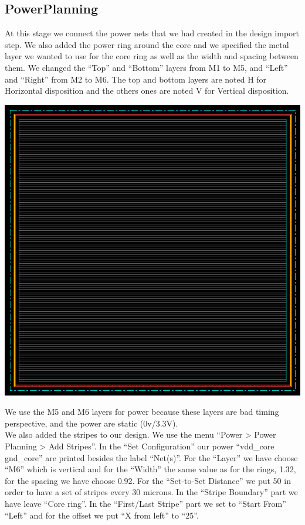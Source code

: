 \documentclass[12pt]{article}
\begin{document}
\subsection{PowerPlanning}
At this stage we connect the power nets that we had created in the design import step. We also added the power ring around the core and we specified the metal layer we wanted to use for the core ring as well as the width and spacing between them. We changed the “Top” and “Bottom” layers from M1 to M5, and “Left” and “Right” from M2 to M6. The top and bottom layers are noted H for Horizontal disposition and the others ones are noted V for Vertical disposition.\\

\begin{center}
\includegraphics[scale=0.4]{pic/ring.png}
\end{center}
We use the M5 and M6 layers for power because these layers are bad timing perspective, and the power are static (0v/3.3V).\\
We also added the stripes to our design. We use the menu “Power > Power Planning > Add Stripes”. In the “Set Configuration” our power “vdd\_core gnd\_core” are printed besides the label “Net(s)”. For the “Layer” we have choose “M6” which is vertical and for the “Width” the same value as for the rings, 1.32, for the spacing we have choose 0.92. For the “Set-to-Set Distance” we put 50 in order to have a set of stripes every 30 microns. In the “Stripe Boundary” part we have leave “Core ring”. In the “First/Last Stripe” part we set to “Start From” “Left” and for the offset we put “X from left” to “25”.\\ 
\end{document}
